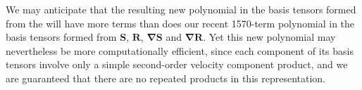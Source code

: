 We may anticipate that the resulting new polynomial in the basis tensors formed from the   will have more terms than does our recent 1570-term polynomial in the basis tensors formed from $\mathbf{S}$, $\mathbf{R}$, $\mathbf{\nabla S}$ and $\mathbf{\nabla R}$. Yet this new polynomial may nevertheless be more computationally efficient, since each component of its basis tensors involve only a simple second-order velocity component product, and we are guaranteed that there are no repeated products in this representation. 

